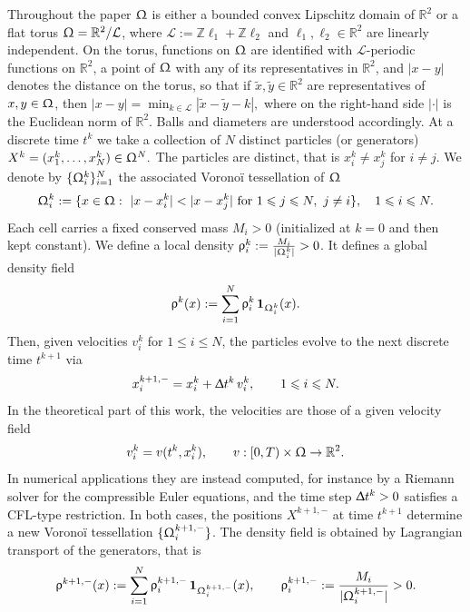 \documentclass[letterpaper,11pt,twoside]{article}
\numberwithin{figure}{section}
\numberwithin{table}{section}
\theoremstyle{cpamplain}
\theoremstyle{cpamdefinition}
\newcommand{\R}{\mathbb{R}}
\let\rho\uprho
\let\Delta\Updelta
\let\Omega\Upomega
\renewcommand{\leq}{\leqslant}
\renewcommand{\le}{\leqslant}
\numberwithin{equation}{section}
\begin{document}
Throughout the paper $\Omega$ is either a bounded convex Lipschitz domain of $\mathbb R^2$ or a flat torus $\Omega=\R^2/\mathcal L$, where $\mathcal L:=\mathbb Z\ell_1+\mathbb Z\ell_2$ and $\ell_1,\ell_2\in\R^2$ are linearly independent.
On the torus, functions on $\Omega$ are identified with $\mathcal L$-periodic functions on $\R^2$, a point of $\Omega$ with any of its representatives in $\R^2$, and $|x-y|$ denotes the distance on the torus, so that if $\tilde x,\tilde y\in\R^2$ are representatives of $x,y\in\Omega$, then
\(|x-y|=\min_{k\in\mathcal L}|\tilde x-\tilde y-k|,\)
where on the right-hand side $|\cdot|$ is the Euclidean norm of $\R^2$. Balls and diameters are understood accordingly.
At a discrete time $t^k$
we take a collection of $N$ distinct particles (or generators)
$
X^k=(x_1^k,\dots,x_N^k)\in\Omega^N.
$
The particles are distinct, that is $x_i^k\neq x_j^k$ for $i\neq j$.
We denote by $\{\Omega_i^k\}_{i=1}^N$ the associated Vorono\"i tessellation of $\Omega$
\[
\Omega_i^k:=\{x\in\Omega:\ |x-x_i^k|< |x-x_j^k| \mbox{ for }1\leq  j\leq N,\ j\neq i\}, \quad 1\leq i \leq N.
\]
Each cell carries a fixed conserved mass $M_i> 0$ (initialized at $k=0$ and then kept constant). We define
a local density $\rho_i^k:=\frac{M_i}{|\Omega_i^k|} >0$. It defines a global density field
\begin{equation}\label{eq:rho-def}
\rho^k(x):=\sum_{i=1}^N \rho_i^k\,\mathbf 1_{\Omega_i^k}(x).
\end{equation}
Then, given velocities $v_i^k$ for $1\leq i \leq N$, the particles evolve to the next discrete time $t^{k+1}$ via
\begin{equation}\label{eq:lag-step-0}
x_i^{k+1,-}=x_i^k+\Delta t^k\,v_i^k,
\qquad 1\le i\le N.
\end{equation}
In the theoretical part of this work, the velocities are those of a given velocity field 
$$
v_i^k=v(t^k, x_i^k), \qquad v:[0,T)\times \Omega \to \R^2.
$$
In numerical applications they are instead computed, for instance by a Riemann solver for the compressible Euler equations, and the time step $\Delta t^k>0$ satisfies a CFL-type restriction.
In both cases, the positions $X^{k+1,-}$ at time $t^{k+1}$ determine a new Vorono\"i tessellation $\{\Omega_i^{k+1,-}\}$.
The density field is obtained by Lagrangian transport of the generators, that is
\begin{equation}\label{eq:rho-def-1}
\rho^{k+1,-}(x):=\sum_{i=1}^N \rho_i^{k+1,-}\,\mathbf 1_{\Omega_i^{k+1,-}}(x), \qquad \rho_i^{k+1,-}:=\frac{M_i}{|\Omega_i^{k+1,-}|} >0.
\end{equation}
\end{document}
